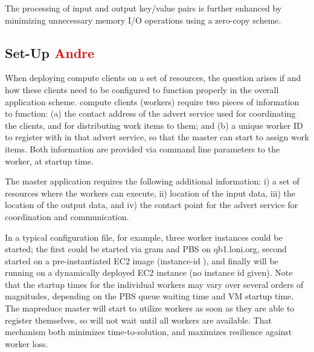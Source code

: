 \documentclass[3p,twocolumn]{elsarticle}
\begin{document}

The processing of input and output key/value pairs is further enhanced by
minimizing unnecessary memory I/O operations using a zero-copy scheme.

\subsection{\sagamapreduce Set-Up \textcolor{red}{Andre}}

When deploying compute clients on a  set of resources, the
question arises if and how these clients need to be configured to
function properly in the overall application scheme.  \sagamapreduce
compute clients (workers) require two pieces of information to
function: (a) the contact address of the advert service used for
coordinating the clients, and for distributing work items to them; and
(b) a unique worker ID to register with in that advert service, so
that the master can start to assign work items.  Both information are
provided via command line parameters to the worker, at startup time.

The master application requires the following additional information:
i) a set of resources where the workers can execute, ii) location of
the input data, iii) the location of the output data, and iv) the
contact point for the advert service for coordination and
communication.  

In a typical configuration file, for example, three worker instances
could be started; the first could be started via gram and PBS on
qb1.loni.org, second started on a pre-instantiated EC2 image
(instance-id ), and finally will be running on a
dynamically deployed EC2 instance (no instance id given).  Note that
the startup times for the individual workers may vary over several
orders of magnitudes, depending on the PBS queue waiting time and VM
startup time.  The mapreduce master will start to utilize workers as
soon as they are able to register themselves, so will not wait until
all workers are available.  That mechanism both minimizes
time-to-solution, and maximizes resilience against worker loss.
\end{document}
